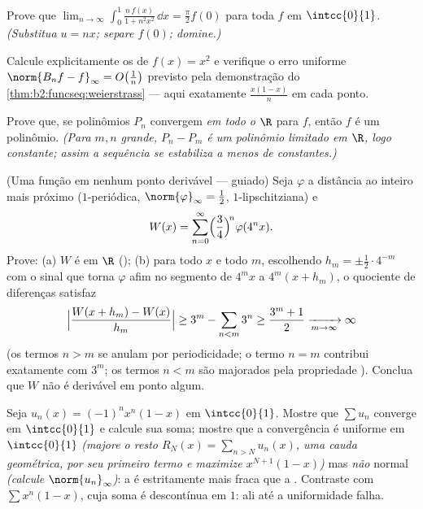 \begin{exercise}[$\star\star$]\label{exo:b2:funcseq:6}
Prove que $\displaystyle\lim_{n\to\infty} \int_0^1
\frac{n\,f(x)}{1 + n^2x^2}\,\dd x = \frac{\pi}{2} f(0)$ para toda
$f$  em $\intcc{0}{1}$. \emph{(Substitua $u = nx$; separe
$f(0)$; domine.)}
\end{exercise}

\begin{exercise}[$\star\star$]\label{exo:b2:funcseq:7}
Calcule explicitamente os  de $f(x) = x^2$ e
verifique o erro uniforme $\norm{B_n f - f}_\infty =
O\bigl(\frac1n\bigr)$ previsto pela demonstração do
\cref{thm:b2:funcseq:weierstrass} --- aqui exatamente $\frac{x(1 -
x)}{n}$ em cada ponto.
\end{exercise}

\begin{exercise}[$\star\star$]\label{exo:b2:funcseq:8}
Prove que, se polinômios $P_n$ convergem  \emph{em todo
o $\R$} para $f$, então $f$ é um polinômio. \emph{(Para $m, n$ grande,
$P_n - P_m$ é um polinômio limitado em $\R$, logo constante; assim a
sequência se estabiliza a menos de constantes.)}
\end{exercise}

\begin{exercise}[$\star\star\star$]\label{exo:b2:funcseq:9}
(Uma função  em nenhum ponto derivável --- guiado) Seja
$\varphi$ a distância ao inteiro mais próximo ($1$-periódica,
$\norm{\varphi}_\infty = \frac12$, $1$-lipschitziana) e
\[
W(x) = \sum_{n=0}^{\infty} \Bigl(\frac{3}{4}\Bigr)^{\!n}
\varphi(4^n x) .
\]
Prove: (a) $W$ é  em $\R$ (); (b) para
todo $x$ e todo $m$, escolhendo $h_m = \pm\frac12\cdot 4^{-m}$
com o sinal que torna $\varphi$ afim no segmento de $4^m x$
a $4^m(x + h_m)$, o quociente de diferenças satisfaz
\[
\Bigl|\frac{W(x + h_m) - W(x)}{h_m}\Bigr| \geq 3^m -
\sum_{n<m} 3^n \geq \frac{3^m + 1}{2} \xrightarrow[m\to\infty]{}
\infty
\]
(os termos $n > m$ se anulam por periodicidade; o termo $n = m$ contribui
exatamente com $3^m$; os termos $n < m$ são majorados pela propriedade ).
Conclua que $W$ não é derivável em ponto algum.
\end{exercise}

\begin{exercise}[$\star$]\label{exo:b2:funcseq:10}
Seja $u_n(x) = (-1)^n x^n(1 - x)$ em $\intcc{0}{1}$. Mostre que
$\sum u_n$ converge  em $\intcc{0}{1}$ e calcule sua
soma; mostre que a convergência é uniforme em $\intcc{0}{1}$
\emph{(majore o resto $R_N(x) = \sum_{n > N} u_n(x)$, uma
cauda geométrica, por seu primeiro termo e maximize $x^{N+1}(1-x)$)}
mas \emph{não} normal \emph{(calcule $\norm{u_n}_\infty$)}:
a  é estritamente mais fraca que a .
Contraste com $\sum x^n(1-x)$, cuja soma é descontínua em
$1$: ali até a uniformidade falha.
\end{exercise}

